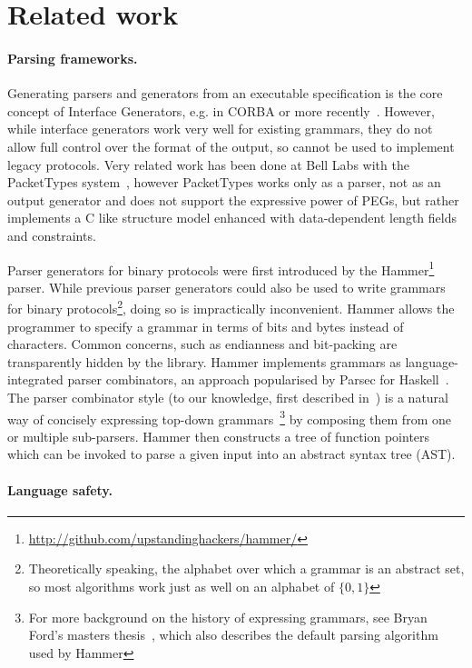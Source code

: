 \section{Related work}

\paragraph{Parsing frameworks.}

Generating parsers and generators from an executable specification
is the core concept of Interface Generators, e.g. in CORBA or more
recently~\cite{varda2008}. However, while interface generators work
very well for existing grammars, they do not allow full control over the
format of the output, so cannot be used to implement legacy protocols.
Very related work has been done at Bell Labs with the PacketTypes
system~\cite{mccann2000packet}, however PacketTypes works only as a
parser, not as an output generator and does not support the expressive
power of PEGs, but rather implements a C like structure model enhanced
with data-dependent length fields and constraints.

Parser generators for binary protocols were first introduced by the
Hammer\footnote{\url{http://github.com/upstandinghackers/hammer/}} parser.
While previous parser generators could also be used to write grammars
for binary protocols\footnote{Theoretically speaking, the alphabet
over which a grammar is an  abstract set, so most algorithms work
just as well on an alphabet of $\{0,1\}$}, doing so is impractically
inconvenient. Hammer allows the programmer to specify a grammar in
terms of bits and bytes instead of characters. Common concerns, such as
endianness and bit-packing are transparently hidden by the library. Hammer
implements grammars as language-integrated parser combinators, an approach
popularised by Parsec for Haskell~\cite{LeijenMeijer:parsec}. The
parser combinator style (to our knowledge, first  described
in~\cite{burge1975recursive}) is a natural way of concisely expressing
top-down grammars~\cite{Danielsson:2010:TPC:1863543.1863585}\footnote{For
more background on the history of expressing grammars, see Bryan Ford's
masters thesis~\cite{ford2002packrat}, which also describes the default
parsing algorithm used by Hammer} by composing them from one or multiple
sub-parsers.  Hammer then constructs a tree of function pointers which
can be invoked to parse a given input into an abstract syntax tree (AST).


\paragraph{Language safety.}

